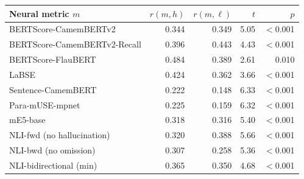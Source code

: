 \setlength{\tabcolsep}{4pt}
\begin{tabular}{lrrrr}
\toprule
Neural metric $m$ & $r(m,h)$ & $r(m,\ell)$ & $t$ & $p$ \\
\midrule
BERTScore-CamemBERTv2 & 0.344 & 0.349 & 5.05 & $<$0.001 \\
BERTScore-CamemBERTv2-Recall & 0.396 & 0.443 & 4.43 & $<$0.001 \\
BERTScore-FlauBERT & 0.484 & 0.389 & 2.61 & 0.010 \\
LaBSE & 0.424 & 0.362 & 3.66 & $<$0.001 \\
Sentence-CamemBERT & 0.222 & 0.148 & 6.33 & $<$0.001 \\
Para-mUSE-mpnet & 0.225 & 0.159 & 6.32 & $<$0.001 \\
mE5-base & 0.318 & 0.316 & 5.40 & $<$0.001 \\
NLI-fwd (no hallucination) & 0.320 & 0.388 & 5.66 & $<$0.001 \\
NLI-bwd (no omission) & 0.307 & 0.258 & 5.36 & $<$0.001 \\
NLI-bidirectional (min) & 0.365 & 0.350 & 4.68 & $<$0.001 \\
\bottomrule
\end{tabular}